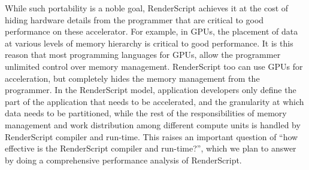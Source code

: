 While such portability is a noble goal, RenderScript achieves it at the cost of
hiding hardware details from the programmer that are critical to good
performance on these accelerator. For example, in GPUs, the placement of data at
various levels of memory hierarchy is critical to good performance.
It is this reason that most programming languages for GPUs, allow the programmer
unlimited control over memory management. RenderScript too can use GPUs for acceleration, but
completely hides the memory management from the programmer. In the RenderScript
model, application developers only define the part of the application that needs
to be accelerated, and the granularity at which data needs to be partitioned,
while the rest of the responsibilities of memory management and work distribution
among different compute units is handled by RenderScript compiler and run-time.
This raises an important
question of ``how effective is the RenderScript compiler and run-time?'', which
we plan to answer by doing a comprehensive performance analysis of RenderScript.
